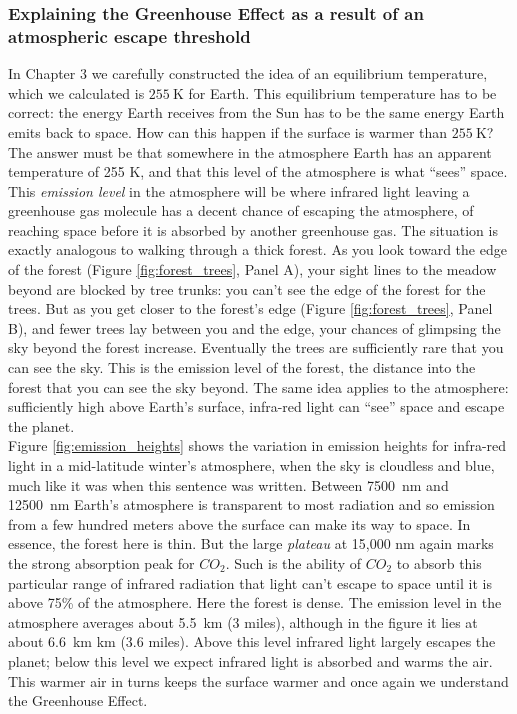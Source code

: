 \documentclass[amstex,12pt]{book}
\begin{document}
\subsubsection{Explaining the Greenhouse Effect as a result of an atmospheric escape threshold}
In Chapter 3 we carefully constructed the idea of an equilibrium temperature, which we calculated is $\SI{255}{\kelvin}$ for Earth. This equilibrium temperature has to be correct: the energy Earth receives from the Sun has to be the same energy Earth emits back to space. How can this happen if the surface is warmer than $\SI{255}{\kelvin}$? The answer must be that somewhere in the atmosphere Earth has an apparent temperature of 255 K, and that this level of the atmosphere is what ``sees'' space. This \emph{emission level} in the atmosphere will be where infrared light leaving a greenhouse gas molecule has a decent chance of escaping the atmosphere, of reaching space before it is absorbed by another greenhouse gas. The situation is exactly analogous to walking through a thick forest. As you look toward the edge of the forest (Figure \ref{fig:forest_trees}, Panel A), your sight lines to the meadow beyond are blocked by tree trunks: you can't see the edge of the forest for the trees. But as you get closer to the forest’s edge (Figure \ref{fig:forest_trees}, Panel B), and fewer trees lay between you and the edge, your chances of glimpsing the sky beyond the forest increase. Eventually the trees are sufficiently rare that you can see the sky. This is the emission level of the forest, the distance into the forest that you can see the sky beyond. The same idea applies to the atmosphere: sufficiently high above Earth’s surface, infra-red light can ``see'' space and escape the planet.\\

Figure \ref{fig:emission_heights} shows the variation in emission heights for infra-red light in a mid-latitude winter's atmosphere, when the sky is cloudless and blue, much like it was when this sentence was written. Between \SI{7500}{\nano\metre} and \SI{12500}{\nano\metre} Earth's atmosphere is transparent to most radiation and so emission from a few hundred meters above the surface can make its way to space. In essence, the forest here is thin. But the large \textit{plateau} at 15,000 nm again marks the strong absorption peak for $CO_2$. Such is the ability of $CO_2$ to absorb this particular range of infrared radiation that light can't escape to space until it is above 75\% of the atmosphere. Here the forest is dense. The emission level in the atmosphere averages about \SI{5.5}{\kilo\metre} (3 miles), although in the figure it lies at about \SI{6.6}{\kilo\metre} km (3.6 miles). Above this level infrared light largely escapes the planet; below this level we expect infrared light is absorbed and warms the air. This warmer air in turns keeps the surface warmer and once again we understand the Greenhouse Effect. 
\end{document}

